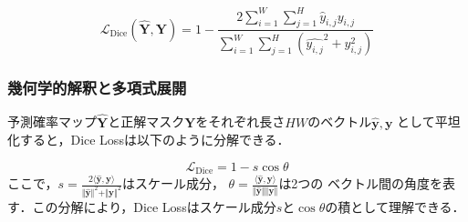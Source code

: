 \documentclass[10pt, a4paper, twocolumn]{jarticle}
\begin{document}
\begin{equation}
  \mathcal{L}_{\text{Dice}}(\hat{\mathbf{Y}}, \mathbf{Y}) = 1 - \frac{2 \sum_{i=1}^{W} \sum_{j=1}^{H} \hat{y}_{i, j} y_{i, j}}{\sum_{i=1}^{W} \sum_{j=1}^{H}(\hat{y_{i, j}} ^ 2 + y_{i, j} ^ 2)}
\end{equation}

\subsubsection{幾何学的解釈と多項式展開}

予測確率マップ$\hat{\mathbf{Y}}$と正解マスク$\mathbf{Y}$をそれぞれ長さ$HW$のベクトル$\hat{\mathbf{y}}, \mathbf{y}$
として平坦化すると，Dice Lossは以下のように分解できる．

\begin{equation}
  \mathcal{L}_{\text{Dice}} = 1 - s \cos  \theta
\end{equation}
ここで，$s = \frac{2 \langle \hat{\mathbf{y}}, {\mathbf{y}} \rangle}{\Vert \hat{\mathbf{y}} \Vert ^ 2 + \Vert {\mathbf{y}} \Vert ^ 2}$はスケール成分，
$\theta = \frac{\langle \hat{\mathbf{y}}, {\mathbf{y}}\rangle}{\Vert \hat{\mathbf{y}} \Vert \Vert {\mathbf{y}}\Vert}$は2つの
ベクトル間の角度を表す．この分解により，Dice Lossはスケール成分$s$と$\cos \theta$の積として理解できる．
\end{document}
